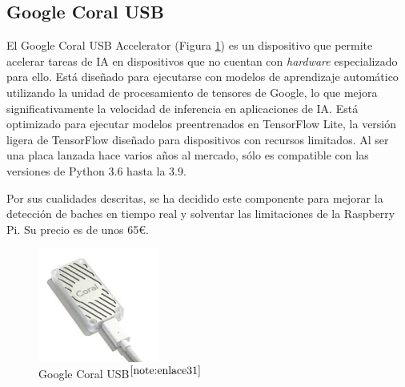 \setcounter{footnote}{29} %

\setcounter{footnote}{30} %


\subsection{Google Coral USB}
\label{subsec:googlecoral}

El Google Coral USB Accelerator (Figura \ref{fig:googlecoral}) es un dispositivo que permite acelerar tareas de \ac{IA} en dispositivos que no cuentan con \textit{hardware} especializado para ello. Está diseñado para ejecutarse con modelos de aprendizaje automático utilizando la unidad de procesamiento de tensores de Google, lo que mejora significativamente la velocidad de inferencia en aplicaciones de \acs{IA}. Está optimizado para ejecutar modelos preentrenados en TensorFlow Lite, la versión ligera de TensorFlow diseñado para dispositivos con recursos limitados. Al ser una placa lanzada hace varios años al mercado, sólo es compatible con  las versiones de Python 3.6 hasta la 3.9.

Por sus cualidades descritas, se ha decidido este componente para mejorar la detección de baches en tiempo real y solventar las limitaciones de la Raspberry Pi. Su precio es de unos 65€.
 
\begin{figure} [h!]
	\begin{center}
		\includegraphics[width=4cm]{figs/googlecoral.png}
	\end{center}
	\caption{Google Coral USB$^{\ref{note:enlace31}}$} 
	\label{fig:googlecoral}
\end{figure}

\setcounter{footnote}{31} %

